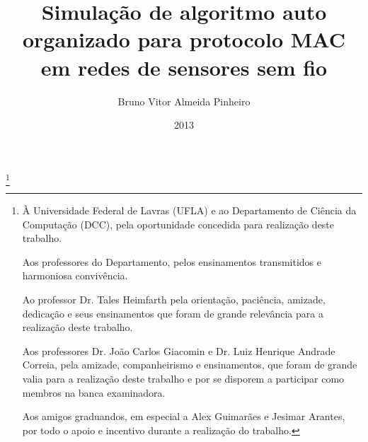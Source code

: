 \documentclass{uflamon}          %
\author{Bruno Vitor Almeida Pinheiro}
\title{Simulação de algoritmo auto organizado para protocolo MAC em redes de sensores sem fio}
\date{2013}
\begin{document}
\maketitle

\thanks{
À Universidade Federal de Lavras (UFLA) e ao Departamento de Ciência da Computação (DCC), pela oportunidade concedida para realização deste trabalho.

Aos professores do Departamento, pelos ensinamentos transmitidos e harmoniosa convivência.

Ao professor Dr. Tales Heimfarth pela orientação, paciência, amizade, dedicação e seus ensinamentos que foram de grande relevância para a realização deste trabalho.

Aos professores Dr. João Carlos Giacomin e Dr. Luiz Henrique Andrade Correia, pela amizade, companheirismo e ensinamentos, que foram de grande valia para a realização deste trabalho e por se disporem a participar como membros na banca examinadora.

Aos amigos graduandos, em especial a Alex Guimarães e Jesimar Arantes, por todo o apoio e incentivo durante a realização do trabalho.}         %

\pagestyle{ufla}

\tableofcontents                           %
\listoffigures                             %
\end{document}
